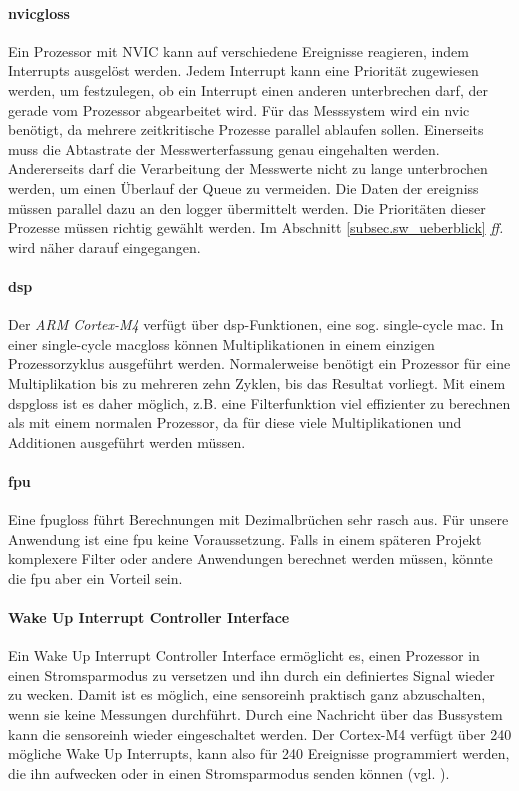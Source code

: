 \paragraph{\gls{nvicgloss}} Ein Prozessor mit NVIC kann auf verschiedene Ereignisse reagieren, indem Interrupts ausgelöst werden. Jedem Interrupt kann eine Priorität zugewiesen werden, um festzulegen, ob ein Interrupt einen anderen unterbrechen darf, der gerade vom Prozessor abgearbeitet wird. Für das Messsystem wird ein \gls{nvic} benötigt, da mehrere zeitkritische Prozesse parallel ablaufen sollen. Einerseits muss die Abtastrate der Messwerterfassung genau eingehalten werden. Andererseits darf die Verarbeitung der Messwerte nicht zu lange unterbrochen werden, um einen Überlauf der Queue zu vermeiden. Die Daten der \glspl{ereignis} müssen parallel dazu an den \gls{logger} übermittelt werden. Die Prioritäten dieser Prozesse müssen richtig gewählt werden. Im Abschnitt \ref{subsec.sw_ueberblick} \emph{ff.} wird näher darauf eingegangen.

\paragraph{\gls{dsp}} Der \emph{ARM Cortex-M4} verfügt über \gls{dsp}-Funktionen, eine sog. single-cycle \gls{mac}. In einer single-cycle \gls{macgloss} können Multiplikationen in einem einzigen Prozessorzyklus ausgeführt werden. Normalerweise benötigt ein Prozessor für eine Multiplikation bis zu mehreren zehn Zyklen, bis das Resultat vorliegt. Mit einem \gls{dspgloss} ist es daher möglich, z.B. eine Filterfunktion viel effizienter zu berechnen als mit einem normalen Prozessor, da für diese viele Multiplikationen und Additionen ausgeführt werden müssen.

\paragraph{\gls{fpu}} Eine \gls{fpugloss} führt Berechnungen mit Dezimalbrüchen sehr rasch aus. Für unsere Anwendung ist eine \gls{fpu} keine Voraussetzung. Falls in einem späteren Projekt komplexere Filter oder andere Anwendungen berechnet werden müssen, könnte die \gls{fpu} aber ein Vorteil sein.

\paragraph{Wake Up Interrupt Controller Interface} Ein Wake Up Interrupt Controller Interface ermöglicht es, einen Prozessor in einen Stromsparmodus zu versetzen und ihn durch ein definiertes Signal wieder zu wecken. Damit ist es möglich, eine \gls{sensoreinh} praktisch ganz abzuschalten, wenn sie keine Messungen durchführt. Durch eine Nachricht über das Bussystem kann die \gls{sensoreinh} wieder eingeschaltet werden. Der Cortex-M4 verfügt über 240 mögliche Wake Up Interrupts, kann also für 240 Ereignisse programmiert werden, die ihn aufwecken oder in einen Stromsparmodus senden können (vgl. \cite{armcortex}).

